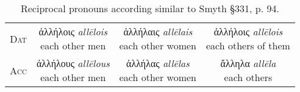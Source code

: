 \documentclass[10pt]{memoir}
\newcommand{\tsc}[1]{\textsc{#1}}
\newcommand{\grc}[1]{\fontspec{Inter}#1}
\newcommand{\trc}[1]{\textit{\fontspec{Tinos}#1}}
\begin{document}
\begin{table}[H]
\begin{tabular}{c|ccc}
            \tsc{Dat} & \makecell{\grc{ἀλλήλοις} \trc{allēlois} \\ \small each other men} & \makecell{\grc{ἀλλήλαις} \trc{allēlais}\\ \small each other women} & \makecell{\grc{ἀλλήλοις} \trc{allēlois} \\ \small each others of them } \\
            \tsc{Acc} & \makecell{\grc{ἀλλήλους} \trc{allēlous} \\ \small each other men} & \makecell{\grc{ἀλλήλας} \trc{allēlas} \\ \small each other women} & \makecell{\grc{ἄλληλα} \trc{allēla} \\ \small each others} \\
        \end{tabular}
        \caption{Reciprocal pronouns according similar to Smyth §331, p. 94.}
    \end{table}
\end{document}
